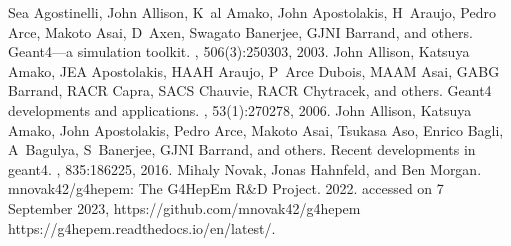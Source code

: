 \documentclass[letterpaper,10pt,english]{sphinxmanual}
\begin{document}
\begin{sphinxthebibliography}{1}
\sphinxAtStartPar
Sea Agostinelli, John Allison, K al Amako, John Apostolakis, H Araujo, Pedro Arce, Makoto Asai, D Axen, Swagato Banerjee, GJNI Barrand, and others. Geant4—a simulation toolkit. , 506(3):250\textendash{}303, 2003.
\sphinxAtStartPar
John Allison, Katsuya Amako, JEA Apostolakis, HAAH Araujo, P Arce Dubois, MAAM Asai, GABG Barrand, RACR Capra, SACS Chauvie, RACR Chytracek, and others. Geant4 developments and applications. , 53(1):270\textendash{}278, 2006.
\sphinxAtStartPar
John Allison, Katsuya Amako, John Apostolakis, Pedro Arce, Makoto Asai, Tsukasa Aso, Enrico Bagli, A Bagulya, S Banerjee, GJNI Barrand, and others. Recent developments in geant4. , 835:186\textendash{}225, 2016.
\sphinxAtStartPar
Mihaly Novak, Jonas Hahnfeld, and Ben Morgan. mnovak42/g4hepem: The G4HepEm R\&D Project. 2022. accessed on 7 September 2023, https://github.com/mnovak42/g4hepem https://g4hepem.readthedocs.io/en/latest/.
\end{sphinxthebibliography}



\renewcommand{\indexname}{Index}
\printindex
\end{document}
